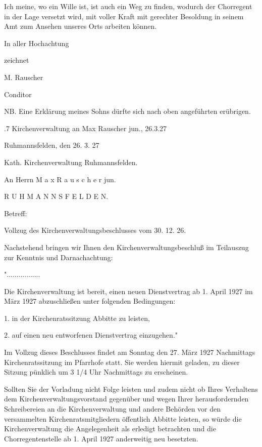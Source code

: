 \documentclass[12pt,a4pager]{book}
\begin{document}
Ich meine, wo ein Wille ist, ist auch ein Weg zu finden, wodurch der Chorregent
in der Lage versetzt wird, mit voller Kraft mit gerechter Besoldung in seinem
Amt zum Ansehen unseres Orts arbeiten können.



    In aller Hochachtung

        zeichnet

        M. Rauscher

            Conditor



NB. Eine Erklärung meines Sohns dürfte sich nach oben angeführten erübrigen.

.7 Kirchenverwaltung an Max Rauscher jun., 26.3.27

Ruhmannsfelden, den 26. 3. 27

Kath. Kirchenverwaltung Ruhmannsfelden.



An Herrn   M a x   R a u s c h e r   jun.



R U H M A N N S F E L D E N.



Betreff:



Vollzug des Kirchenverwaltungsbeschlusses vom 30. 12. 26.



Nachstehend bringen wir Ihnen den Kirchenverwaltungsbeschluß im Teilauszug zur
Kenntnis und Darnachachtung:



".................

Die Kirchenverwaltung ist bereit, einen neuen Dienstvertrag ab 1. April 1927 im
März 1927 abzuschließen unter folgenden Bedingungen:

1. in der Kirchenratssitzung Abbitte zu leisten,

2. auf einen neu entworfenen Dienstvertrag einzugehen."

Im Vollzug dieses Beschlusses findet am Sonntag den 27. März 1927 Nachmittags
Kirchenratssitzung im Pfarrhofe statt. Sie werden hiermit geladen, zu dieser
Sitzung pünklich um 3 1/4 Uhr Nachmittags zu erscheinen.

Sollten Sie der Vorladung nicht Folge leisten und zudem nicht ob Ihres
Verhaltens dem Kirchenverwaltungsvorstand gegenüber und wegen Ihrer
herausfordernden Schreibereien an die Kirchenverwaltung und andere Behörden vor
den versammelten Kirchenratsmitgliedern öffentlich Abbitte leisten, so würde die
Kirchenverwaltung die Angelegenheit als erledigt betrachten und die
Chorregentenstelle ab 1. April 1927 anderweitig neu besetzten.
\end{document}
